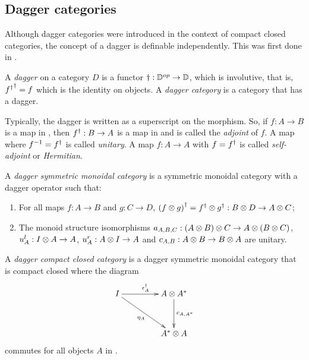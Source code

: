 \subsection{Dagger categories}\label{ssec:daggercategories}

Although dagger categories were introduced in the context of compact closed categories, the concept
of a dagger is definable independently. This was first done in \cite{selinger05:dagger}.

\begin{definition}\label{def:daggercat}
  A \emph{dagger} on a category $D$ is a functor $\dagger:\mathbb{D}^{op}\to \mathbb{D}$, which is  involutive,
  that is, ${{f}^{\dagger}}^{\dagger} = f$ which is the identity on objects. A \emph{dagger category} is a
  category that has a dagger.
\end{definition}

Typically, the dagger is written as a superscript on the morphism. So, if $f:A\to B$ is a map in
\cD, then ${f}^{\dagger}:B\to A$ is a map in \cD{} and is called the \emph{adjoint} of $f$. A map where
$f^{-1} = {f}^{\dagger}$ is called \emph{unitary}. A map $f:A\to A$ with $f={f}^{\dagger}$ is called
\emph{self-adjoint} or \emph{Hermitian}.

\begin{definition}\label{def:daggersmc}
  A \emph{dagger symmetric monoidal category} is a symmetric monoidal category \cD{} with a dagger
  operator such that:
  \begin{enumerate}[{(}i{)}]
    \item For all maps $f:A\to B$ and $g:C\to D$, ${(f\otimes g)}^{\dagger} = {f}^{\dagger}\otimes{g}^{\dagger}:B\otimes D \to A\otimes C$;\label{defitem:dagger_smc_one}
    \item The monoid structure isomorphisms $a_{A,B,C}:(A\otimes B)\otimes C\to A\otimes(B\otimes C)$, $u^l_{A}:I\otimes A\to
      A$, $u^r_{A}:A\otimes I \to A$ and  $c_{A,B}:A\otimes B \to B\otimes A$ are unitary.\label{defitem:dagger_smc_two}
  \end{enumerate}
\end{definition}


\begin{definition}\label{def:daggercompact}
  A \emph{dagger compact closed category} \cD{} is a dagger symmetric monoidal category
  that is compact closed where the diagram
  \[
    \xymatrix @C+20pt @R+10pt{
      I \ar[r]^{\epsilon^{\dagger}_{A}} \ar[dr]_{\eta_{A}} &A\*A^{*}\ar[d]^{c_{A,A^{*}}}\\
      &A^{*}\* A
    }
  \]
  commutes for all  objects $A$ in \cD.
\end{definition}

